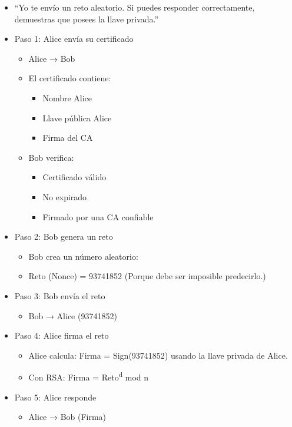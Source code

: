 \documentclass[11pt]{article}
\begin{document}
\begin{itemize}
\item ``Yo te envío un reto aleatorio. Si puedes responder correctamente, demuestras que posees la llave privada.''

\item Paso 1: Alice envía su certificado
\begin{itemize}
\item Alice → Bob
\item El certificado contiene:
\begin{itemize}
\item Nombre Alice
\item Llave pública Alice
\item Firma del CA
\end{itemize}

\item Bob verifica:
\begin{itemize}
\item Certificado válido
\item No expirado
\item Firmado por una CA confiable
\end{itemize}
\end{itemize}

\item Paso 2: Bob genera un reto
\begin{itemize}
\item Bob crea un número aleatorio:
\item Reto (Nonce) = 93741852 (Porque debe ser imposible predecirlo.)
\end{itemize}

\item Paso 3: Bob envía el reto
\begin{itemize}
\item Bob → Alice (93741852)
\end{itemize}

\item Paso 4: Alice firma el reto
\begin{itemize}
\item Alice calcula: Firma = Sign(93741852) usando la llave privada de Alice.
\item Con RSA: Firma = Reto\textsuperscript{d} mod n
\end{itemize}

\item Paso 5: Alice responde
\begin{itemize}
\item Alice → Bob (Firma)
\end{itemize}


\end{itemize}
\end{document}
